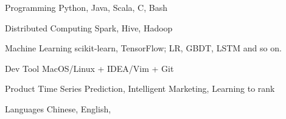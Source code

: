 

\begin{cvskills}

  \cvskill
    {Programming} %
    {Python, Java, Scala, C, Bash} %

  \cvskill
    {Distributed Computing} %
    {Spark, Hive, Hadoop} %

  \cvskill
    {Machine Learning} %
    {scikit-learn, TensorFlow; LR, GBDT, LSTM and so on.} %

  \cvskill
    {Dev Tool} %
    {MacOS/Linux + IDEA/Vim + Git} %

  \cvskill
    {Product} %
    {Time Series Prediction, Intelligent Marketing, Learning to rank} %

  \cvskill
    {Languages} %
    {Chinese, English,} %

\end{cvskills}
